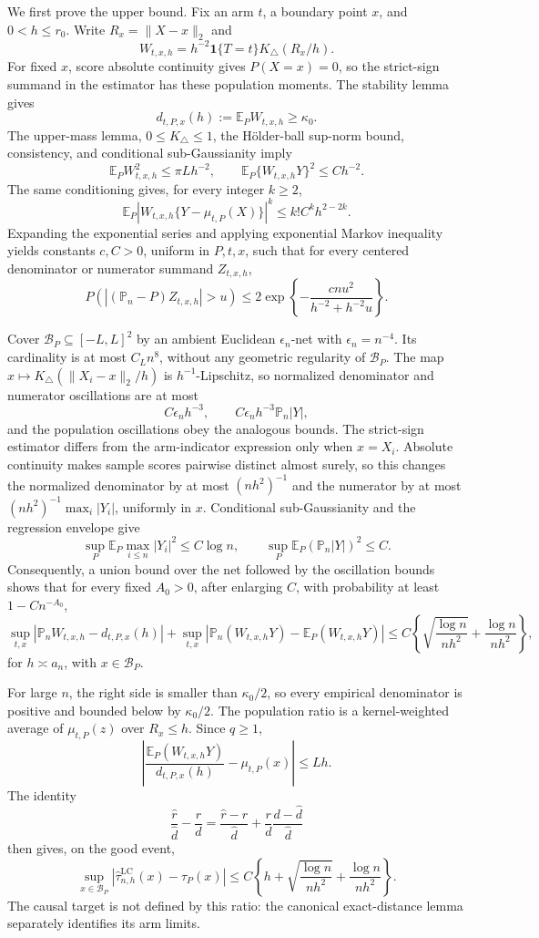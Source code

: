 We first prove the upper bound.  Fix an arm \(t\), a boundary point \(x\), and \(0<h\leq r_0\).  Write \(R_x=\lVert X-x\rVert_2\) and
\[
 W_{t,x,h}=h^{-2}\mathbf1\{T=t\}K_\triangle(R_x/h).
\]
For fixed \(x\), score absolute continuity gives \(P(X=x)=0\), so the strict-sign summand in the estimator has these population moments.  The stability lemma gives
\[
 d_{t,P,x}(h):=\mathbb E_PW_{t,x,h}\geq\kappa_0.
\]
The upper-mass lemma, \(0\leq K_\triangle\leq1\), the H\"older-ball sup-norm bound, consistency, and conditional sub-Gaussianity imply
\[
 \mathbb E_PW_{t,x,h}^2\leq \pi Lh^{-2},
 \qquad
 \mathbb E_P\{W_{t,x,h}Y\}^2\leq Ch^{-2}.
\]
The same conditioning gives, for every integer \(k\geq2\),
\[
 \mathbb E_P|W_{t,x,h}\{Y-\mu_{t,P}(X)\}|^k
 \leq k!C^k h^{2-2k}.
\]
Expanding the exponential series and applying exponential Markov inequality yields constants \(c,C>0\), uniform in \(P,t,x\), such that for every centered denominator or numerator summand \(Z_{t,x,h}\),
\[
 P\!\left(\left|(\mathbb P_n-P)Z_{t,x,h}\right|>u\right)
 \leq2\exp\!\left\{-\frac{cnu^2}{h^{-2}+h^{-2}u}\right\}.
\]

Cover \(\mathcal B_P\subseteq[-L,L]^2\) by an ambient Euclidean \(\epsilon_n\)-net with \(\epsilon_n=n^{-4}\).  Its cardinality is at most \(C_Ln^8\), without any geometric regularity of \(\mathcal B_P\).  The map \(x\mapsto K_\triangle(\lVert X_i-x\rVert_2/h)\) is \(h^{-1}\)-Lipschitz, so normalized denominator and numerator oscillations are at most
\[
 C\epsilon_nh^{-3},
 \qquad C\epsilon_nh^{-3}\mathbb P_n|Y|,
\]
and the population oscillations obey the analogous bounds.  The strict-sign estimator differs from the arm-indicator expression only when \(x=X_i\).  Absolute continuity makes sample scores pairwise distinct almost surely, so this changes the normalized denominator by at most \((nh^2)^{-1}\) and the numerator by at most \((nh^2)^{-1}\max_i|Y_i|\), uniformly in \(x\).  Conditional sub-Gaussianity and the regression envelope give
\[
 \sup_P\mathbb E_P\max_{i\leq n}|Y_i|^2\leq C\log n,
 \qquad
 \sup_P\mathbb E_P(\mathbb P_n|Y|)^2\leq C.
\]
Consequently, a union bound over the net followed by the oscillation bounds shows that for every fixed \(A_0>0\), after enlarging \(C\), with probability at least \(1-Cn^{-A_0}\),
\[
 \sup_{t,x}|\mathbb P_nW_{t,x,h}-d_{t,P,x}(h)|
 +\sup_{t,x}|\mathbb P_n(W_{t,x,h}Y)-\mathbb E_P(W_{t,x,h}Y)|
 \leq C\left\{\sqrt{\frac{\log n}{nh^2}}+\frac{\log n}{nh^2}\right\},
\]
for \(h\asymp a_n\), with \(x\in\mathcal B_P\).

For large \(n\), the right side is smaller than \(\kappa_0/2\), so every empirical denominator is positive and bounded below by \(\kappa_0/2\).  The population ratio is a kernel-weighted average of \(\mu_{t,P}(z)\) over \(R_x\leq h\).  Since \(q\geq1\),
\[
 \left|\frac{\mathbb E_P(W_{t,x,h}Y)}{d_{t,P,x}(h)}-\mu_{t,P}(x)\right|
 \leq Lh.
\]
The identity
\[
 \frac{\widehat r}{\widehat d}-\frac r d
 =\frac{\widehat r-r}{\widehat d}
 +\frac r d\frac{d-\widehat d}{\widehat d}
\]
then gives, on the good event,
\[
 \sup_{x\in\mathcal B_P}
 |\widehat\tau^{\mathrm{LC}}_{n,h}(x)-\tau_P(x)|
 \leq C\left\{h+\sqrt{\frac{\log n}{nh^2}}+\frac{\log n}{nh^2}\right\}.
\]
The causal target is not defined by this ratio: the canonical exact-distance lemma separately identifies its arm limits.

